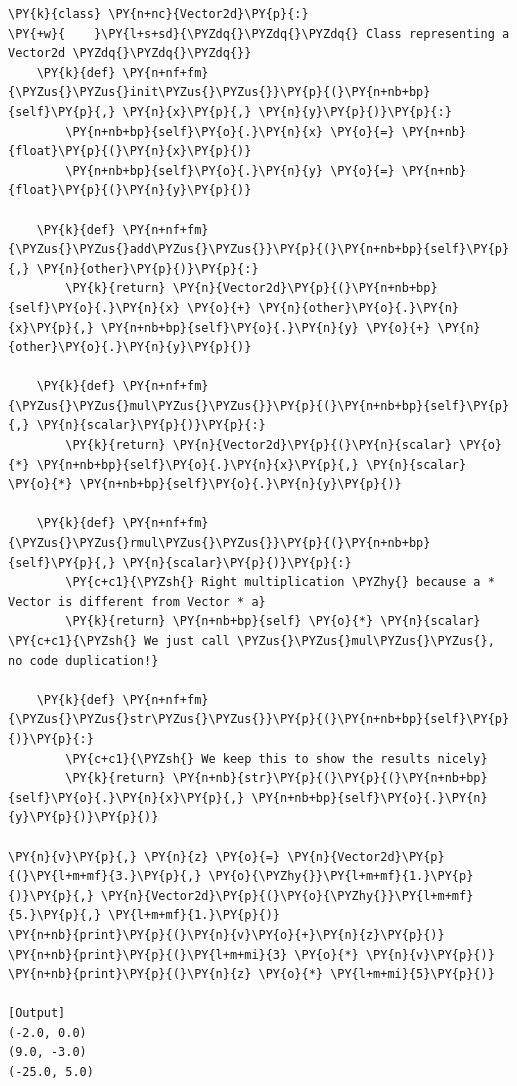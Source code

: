 \begin{Verbatim}[label=\makebox{\url{https://github.com/lucabaldini/cmepda/tree/master/slides/latex/snippets/vector2d\_math.py}},commandchars=\\\{\}]
\PY{k}{class} \PY{n+nc}{Vector2d}\PY{p}{:}
\PY{+w}{    }\PY{l+s+sd}{\PYZdq{}\PYZdq{}\PYZdq{} Class representing a Vector2d \PYZdq{}\PYZdq{}\PYZdq{}}   
    \PY{k}{def} \PY{n+nf+fm}{\PYZus{}\PYZus{}init\PYZus{}\PYZus{}}\PY{p}{(}\PY{n+nb+bp}{self}\PY{p}{,} \PY{n}{x}\PY{p}{,} \PY{n}{y}\PY{p}{)}\PY{p}{:}
        \PY{n+nb+bp}{self}\PY{o}{.}\PY{n}{x} \PY{o}{=} \PY{n+nb}{float}\PY{p}{(}\PY{n}{x}\PY{p}{)}
        \PY{n+nb+bp}{self}\PY{o}{.}\PY{n}{y} \PY{o}{=} \PY{n+nb}{float}\PY{p}{(}\PY{n}{y}\PY{p}{)}
   
    \PY{k}{def} \PY{n+nf+fm}{\PYZus{}\PYZus{}add\PYZus{}\PYZus{}}\PY{p}{(}\PY{n+nb+bp}{self}\PY{p}{,} \PY{n}{other}\PY{p}{)}\PY{p}{:}
        \PY{k}{return} \PY{n}{Vector2d}\PY{p}{(}\PY{n+nb+bp}{self}\PY{o}{.}\PY{n}{x} \PY{o}{+} \PY{n}{other}\PY{o}{.}\PY{n}{x}\PY{p}{,} \PY{n+nb+bp}{self}\PY{o}{.}\PY{n}{y} \PY{o}{+} \PY{n}{other}\PY{o}{.}\PY{n}{y}\PY{p}{)}
    
    \PY{k}{def} \PY{n+nf+fm}{\PYZus{}\PYZus{}mul\PYZus{}\PYZus{}}\PY{p}{(}\PY{n+nb+bp}{self}\PY{p}{,} \PY{n}{scalar}\PY{p}{)}\PY{p}{:}
        \PY{k}{return} \PY{n}{Vector2d}\PY{p}{(}\PY{n}{scalar} \PY{o}{*} \PY{n+nb+bp}{self}\PY{o}{.}\PY{n}{x}\PY{p}{,} \PY{n}{scalar} \PY{o}{*} \PY{n+nb+bp}{self}\PY{o}{.}\PY{n}{y}\PY{p}{)}
        
    \PY{k}{def} \PY{n+nf+fm}{\PYZus{}\PYZus{}rmul\PYZus{}\PYZus{}}\PY{p}{(}\PY{n+nb+bp}{self}\PY{p}{,} \PY{n}{scalar}\PY{p}{)}\PY{p}{:}
        \PY{c+c1}{\PYZsh{} Right multiplication \PYZhy{} because a * Vector is different from Vector * a}
        \PY{k}{return} \PY{n+nb+bp}{self} \PY{o}{*} \PY{n}{scalar} \PY{c+c1}{\PYZsh{} We just call \PYZus{}\PYZus{}mul\PYZus{}\PYZus{}, no code duplication!}
        
    \PY{k}{def} \PY{n+nf+fm}{\PYZus{}\PYZus{}str\PYZus{}\PYZus{}}\PY{p}{(}\PY{n+nb+bp}{self}\PY{p}{)}\PY{p}{:}
        \PY{c+c1}{\PYZsh{} We keep this to show the results nicely}
        \PY{k}{return} \PY{n+nb}{str}\PY{p}{(}\PY{p}{(}\PY{n+nb+bp}{self}\PY{o}{.}\PY{n}{x}\PY{p}{,} \PY{n+nb+bp}{self}\PY{o}{.}\PY{n}{y}\PY{p}{)}\PY{p}{)}
     
\PY{n}{v}\PY{p}{,} \PY{n}{z} \PY{o}{=} \PY{n}{Vector2d}\PY{p}{(}\PY{l+m+mf}{3.}\PY{p}{,} \PY{o}{\PYZhy{}}\PY{l+m+mf}{1.}\PY{p}{)}\PY{p}{,} \PY{n}{Vector2d}\PY{p}{(}\PY{o}{\PYZhy{}}\PY{l+m+mf}{5.}\PY{p}{,} \PY{l+m+mf}{1.}\PY{p}{)}
\PY{n+nb}{print}\PY{p}{(}\PY{n}{v}\PY{o}{+}\PY{n}{z}\PY{p}{)}
\PY{n+nb}{print}\PY{p}{(}\PY{l+m+mi}{3} \PY{o}{*} \PY{n}{v}\PY{p}{)}
\PY{n+nb}{print}\PY{p}{(}\PY{n}{z} \PY{o}{*} \PY{l+m+mi}{5}\PY{p}{)}

[Output]
(-2.0, 0.0)
(9.0, -3.0)
(-25.0, 5.0)
\end{Verbatim}